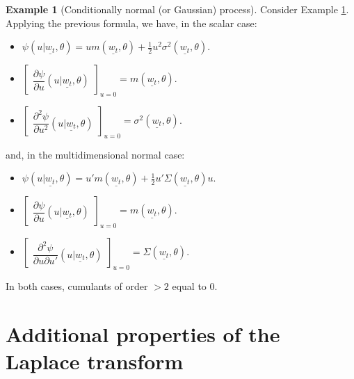 \documentclass[
  12pt,
]{book}
\providecommand{\tightlist}{%
  \setlength{\itemsep}{0pt}\setlength{\parskip}{0pt}}
\theoremstyle{definition}
\theoremstyle{definition}
\newtheorem{example}{Example}[chapter]
\theoremstyle{definition}
\theoremstyle{definition}
\theoremstyle{remark}
\begin{document}
\begin{example}[Conditionally normal (or Gaussian) process]
\protect\hypertarget{exm:exGaussian}{}\label{exm:exGaussian}Consider Example \ref{exm:exGaussian}. Applying the previous formula, we have, in the scalar case:

\begin{itemize}
\tightlist
\item
  \(\psi(u|\underline{w_t},\theta)=u m(\underline{w_t},\theta) + \frac{1}{2}u^2\sigma^2(\underline{w_t},\theta)\).
\item
  \(\left[\begin{array}{l} \dfrac{\partial \psi}{\partial u} (u|\underline{w_t},\theta) \end{array} \right]_{u=0} = m(\underline{w_t},\theta)\).
\item
  \(\left[\begin{array}{l} \dfrac{\partial^2 \psi}{\partial u^2} (u|\underline{w_t},\theta) \end{array} \right]_{u=0} = \sigma^2(\underline{w_t},\theta)\).
\end{itemize}

and, in the multidimensional normal case:

\begin{itemize}
\tightlist
\item
  \(\psi(u|\underline{w_t},\theta)=u' m(\underline{w_t},\theta) + \frac{1}{2}u'\Sigma(\underline{w_t},\theta)u\).
\item
  \(\left[\begin{array}{l} \dfrac{\partial \psi}{\partial u} (u|\underline{w_t},\theta) \end{array} \right]_{u=0} = m(\underline{w_t},\theta)\).
\item
  \(\left[\begin{array}{l} \dfrac{\partial^2 \psi}{\partial u\partial u'} (u|\underline{w_t},\theta) \end{array} \right]_{u=0} = \Sigma(\underline{w_t},\theta)\).
\end{itemize}

In both cases, cumulants of order \(>2\) equal to \(0\).
\end{example}

\hypertarget{additional-properties-of-the-laplace-transform}{%
\section{Additional properties of the Laplace transform}\label{additional-properties-of-the-laplace-transform}}
\end{document}

